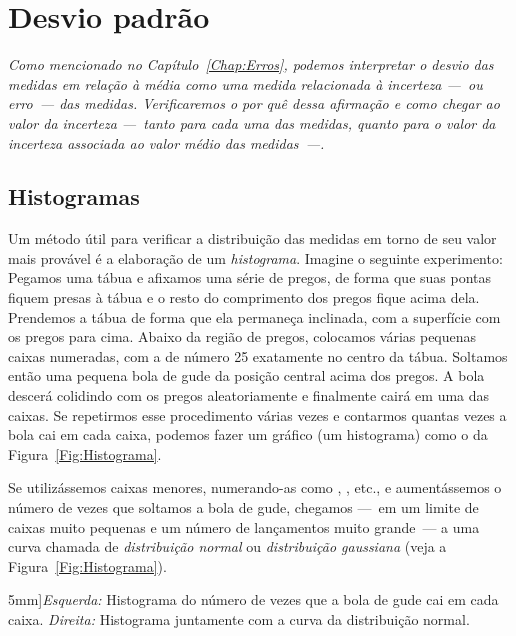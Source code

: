 \chapter{Desvio padrão}
\label{Chap:DesvioPadrao}

{\it
Como mencionado no Capítulo~\ref{Chap:Erros}, podemos interpretar o desvio das medidas em relação à média como uma medida relacionada à incerteza ---~ou erro~--- das medidas. Verificaremos o por quê dessa afirmação e como chegar ao valor da incerteza ---~tanto para cada uma das medidas, quanto para o valor da incerteza associada ao valor médio das medidas~---.
}

\section{Histogramas}

Um método útil para verificar a distribuição das medidas em torno de seu valor mais provável é a elaboração de um \emph{histograma}. Imagine o seguinte experimento: Pegamos uma tábua e afixamos uma série de pregos, de forma que suas pontas fiquem presas à tábua e o resto do comprimento dos pregos fique acima dela. Prendemos a tábua de forma que ela permaneça inclinada, com a superfície com os pregos para cima. Abaixo da região de pregos, colocamos várias pequenas caixas numeradas, com a de número 25 exatamente no centro da tábua. Soltamos então uma pequena bola de gude da posição central acima dos pregos. A bola descerá colidindo com os pregos aleatoriamente e finalmente cairá em uma das caixas. Se repetirmos esse procedimento várias vezes e contarmos quantas vezes a bola cai em cada caixa, podemos fazer um gráfico (um histograma) como o da Figura~\ref{Fig:Histograma}.

Se utilizássemos caixas menores, numerando-as como , , etc., e aumentássemos o número de vezes que soltamos a bola de gude, chegamos ---~em um limite de caixas muito pequenas e um número de lançamentos muito grande~--- a uma curva chamada de \emph{distribuição normal} ou \emph{distribuição gaussiana} (veja a Figura~\ref{Fig:Histograma}).

\begin{figure*}
\forceversofloat
\centering
\caption[][5mm]{\emph{Esquerda:} Histograma do número de vezes que a bola de gude cai em cada caixa. \emph{Direita:} Histograma juntamente com a curva da distribuição normal.}
\label{Fig:Histograma}
\begin{minipage}{0.45\textwidth}
\centering

\end{minipage}
\hfill
\begin{minipage}{0.45\textwidth}
\centering

\end{minipage}
\end{figure*}

